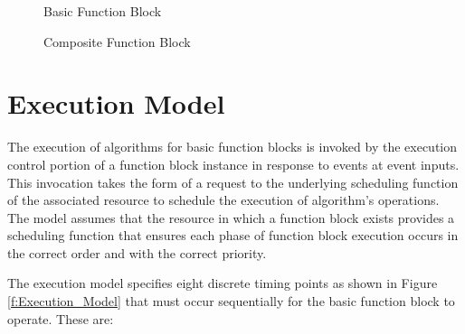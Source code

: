 %
\begin{figure}
\begin{center}
\caption[Basic Function Block]{Basic Function Block{\protect
~\cite{IEC-61499}}} \label{f:Basic_Block}
\end{center}
\end{figure}
%

%
\begin{figure}
\begin{center}
\caption[Composite Function Block]{Composite Function
Block{\protect ~\cite{IEC-61499}}} \label{f:Composite_Block}
\end{center}
\end{figure}
%

\section{Execution Model}

The execution of algorithms for basic function blocks is invoked
by the execution control portion of a function block instance in
response to events at event inputs. This invocation takes the form
of a request to the underlying scheduling function of the
associated resource to schedule the execution of algorithm's
operations. The model assumes that the resource in which a
function block exists provides a scheduling function that ensures
each phase of function block execution occurs in the correct order
and with the correct priority.

The execution model specifies eight discrete timing points as
shown in Figure \ref{f:Execution_Model} that must occur
sequentially for the basic function block to operate. These are:

